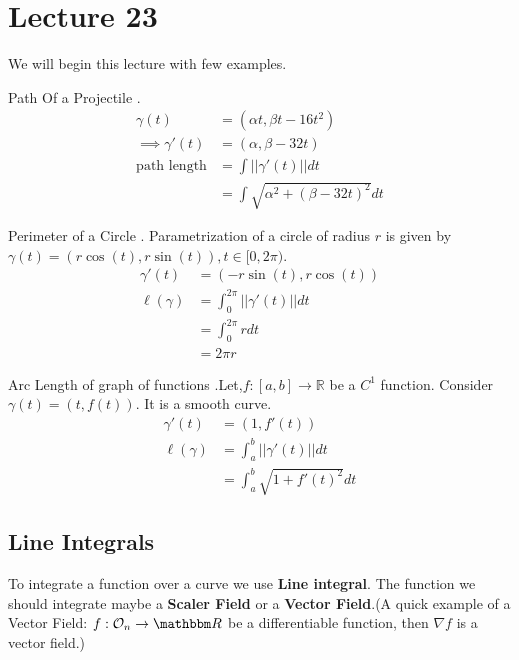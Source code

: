 \documentclass[Analysis-3]{subfiles}
\begin{document}
\chapter*{Lecture 23} %
\setcounter{chapter}{23} %
\setcounter{section}{0}
We will begin this lecture with few examples.
\begin{Eg}{Path Of a Projectile}{}
    . \begin{align*}
        \gamma(t)           & =(\alpha t,\beta t-16t^2)                \\
        \implies \gamma'(t) & = (\alpha ,\beta -32t)                   \\
        \text{path length}  & = \int||\gamma'(t)|| dt                  \\
                            & = \int \sqrt{\alpha^2 +(\beta-32t)^2} dt
    \end{align*}
\end{Eg}

\begin{Eg}{Perimeter of a Circle}{}
    . Parametrization of a circle of radius $r$ is given by $\gamma(t) = (r\cos(t),r\sin(t)), t \in [0,2\pi)$.
    \begin{align*}
        \gamma'(t)    & = (-r\sin(t),r\cos(t))              \\
        \ell (\gamma) & = \int_{0}^{2\pi} ||\gamma'(t)|| dt \\
                      & = \int_{0}^{2\pi} r dt              \\
                      & = 2\pi r
    \end{align*}
\end{Eg}

\begin{Eg}{Arc Length of graph of functions}{}
    .Let,$f : [a,b]\to \mathbb{R}$ be a $C^1$ function. Consider $\gamma(t)=(t,f(t))$. It is a smooth curve.
    \begin{align*}
        \gamma'(t)    & = (1,f'(t))                          \\
        \ell (\gamma) & = \int_{a}^{b} ||\gamma'(t)|| dt     \\
                      & = \int_{a}^{b} \sqrt{1 + f'(t)^2} dt
    \end{align*}
\end{Eg}

\section{Line Integrals}
To integrate a function over a curve we use \textbf{Line integral}. The function we should integrate maybe a \textbf{Scaler Field} or a \textbf{Vector Field}.(A quick example of a Vector Field: $f : \mathcal{O}_n \to \R$ be a differentiable function, then $\nabla f$ is a vector field.)
\end{document}
